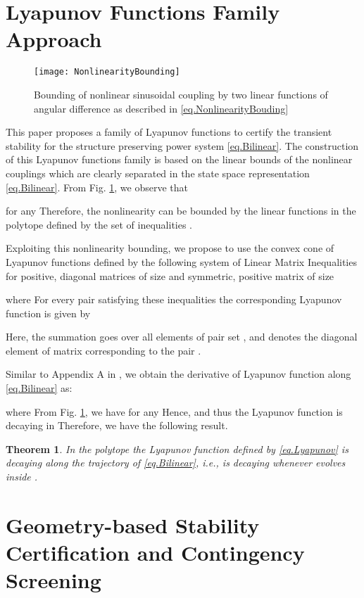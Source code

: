 \documentclass[final]{IEEEtran}
\newtheorem{theorem}{Theorem}\newtheorem{remark}{Remark}\newtheorem{lemma}{Lemma}\usepackage{color}
\begin{document}
\section{Lyapunov Functions Family Approach}
\label{sec:family}
\begin{figure}[t!]
\centering
\texttt{[image: NonlinearityBounding]}
\caption{Bounding of nonlinear sinusoidal coupling  by two
linear functions of angular difference  as described in \eqref{eq.NonlinearityBouding}}
\label{fig.NonlinearityBounding}
\end{figure}
This paper proposes a family of Lyapunov functions to certify the
transient stability for the structure preserving power system \eqref{eq.Bilinear}. The
construction of this Lyapunov functions family is based on the
linear bounds of the nonlinear couplings which are clearly
separated in the state space representation \eqref{eq.Bilinear}.
From Fig. \ref{fig.NonlinearityBounding}, we observe that

for any  Therefore, the nonlinearity  can be bounded by the linear functions in the polytope  defined by the
set of inequalities .


Exploiting this nonlinearity bounding, we propose to use the
convex cone of Lyapunov functions defined by the following system
of Linear Matrix Inequalities for positive, diagonal matrices
 of size  and
symmetric, positive matrix  of size 

where  For every pair  satisfying these
inequalities the corresponding Lyapunov function is given by

Here, the summation goes over all elements of pair set
, and  denotes the diagonal element of
matrix  corresponding to the pair .

Similar to Appendix A in \cite{Vu:2014}, we obtain the derivative of Lyapunov function  along
\eqref{eq.Bilinear} as:

  where 
  From Fig. \ref{fig.NonlinearityBounding}, we have 
  for any  Hence, 
  and thus the Lyapunov function is decaying in  
   Therefore, we have the following result.
\begin{theorem}
\label{thr.LyapunovDecrease} \emph{In the polytope 
the Lyapunov function defined by \eqref{eq.Lyapunov} is decaying
along the trajectory of \eqref{eq.Bilinear}, i.e.,  is
decaying whenever  evolves inside .}
\end{theorem}

\section{Geometry-based Stability Certification and Contingency Screening}
\label{sec:construction}
\end{document}
